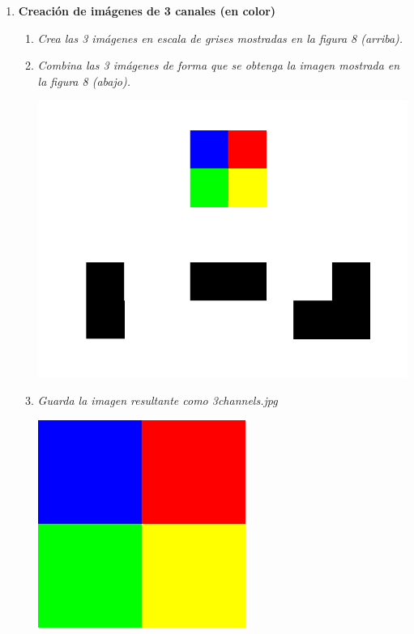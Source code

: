\documentclass[a4paper,10pt]{article}
\begin{document}
\begin{enumerate}
\begin{enumerate}
 \end{enumerate}

\newpage

 \item \textbf{Creación de imágenes de 3 canales (en color)}
 
 \begin{enumerate}
 \item \textit{Crea las 3 imágenes en escala de grises mostradas en la figura 8 (arriba).}
 \item \textit{Combina las 3 imágenes de forma que se obtenga la imagen mostrada en 
la figura 8 (abajo).}

 \begin{center}
 \includegraphics[scale=0.5]{subplot_6} 
 \end{center} 

 \item \textit{Guarda la imagen resultante como 3channels.jpg}

 \begin{center}
 \includegraphics[scale=0.5]{3channels} 
 \end{center}
 


\end{enumerate}
\end{enumerate}
\end{document}
